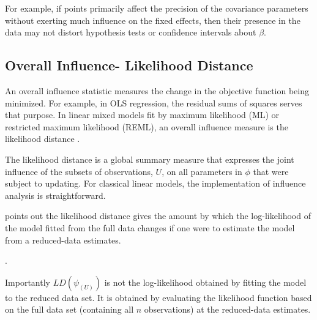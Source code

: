\documentclass[12pt, a4paper]{report}
\theoremstyle{plain}
\theoremstyle{definition}
\theoremstyle{remark}
\begin{document}
For example, if points primarily affect the precision of the covariance parameters without exerting much influence on the fixed effects, then their presence in the data may not distort hypothesis
tests or confidence intervals about $\beta$.






\subsection{Overall Influence- Likelihood Distance}
An overall influence statistic measures the change in the objective function being minimized. For example, in
OLS regression, the residual sums of squares serves that purpose. In linear mixed models fit by
 maximum likelihood (ML) or  restricted maximum likelihood (REML), an overall influence measure is the  likelihood distance \citep{CookWeisberg}.

	
	The  likelihood distance is a global summary measure that expresses the joint influence of the subsets of observations, $U$, on all parameters in $\phi$ that were subject to updating. For classical linear models, the implementation of influence analysis is straightforward.
	
	\citet{schabenberger} points out the likelihood distance gives the amount by which the log-likelihood of the model fitted from the full data changes if one were
	to estimate the model from a reduced-data estimates.
	
. 
	
	
	
	Importantly $LD(\psi_{(U)})$ is not the log-likelihood obtained by fitting the model to the reduced data set. It is obtained by evaluating the likelihood function based on the full data set (containing all $n$ observations) at the reduced-data estimates.
	
\end{document}
